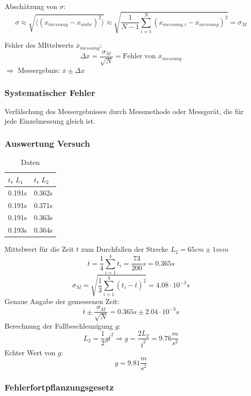 \documentclass[a4paper,10pt, fleqn]{article}
\begin{document}
Abschätzung von $\sigma$:
$$\sigma \approx \sqrt{\langle (x_{messung} - x_{wahr})^{2} \rangle} \approx \sqrt{\frac{1}{N-1}\sum_{i = 1}^{N}(x_{messung, i} - \overline{x}_{messung})^{2}} = \sigma_{M}$$

Fehler des MIttelwerts $\overline{x}_{messung}:$
$$\Delta x = \frac{\sigma_{M}}{\sqrt{N}} = \text{Fehler von } \overline{x}_{messung}$$
$\Rightarrow$ Messergebnis: $\overline{x} \pm \Delta x$

\subsubsection{Systematischer Fehler}
\label{sec:syst-fehl}

Verfälschung des Messergebnisses durch Messmethode oder Messgerät, die
für jede Einzelmessung gleich ist.

\subsubsection{Auswertung Versuch}
\label{sec:auswertung-versuch}

\begin{table}[h]
  \centering
  \begin{tabular}{l | l}
    $t$, $L_{1}$ & $t$, $L_{2}$ \\
    \hline
    0.191s & 0.362s \\
    0.191s & 0.371s \\
    0.191s & 0.363s \\
    0.193s & 0.364s \\
  \end{tabular}
  
  \caption{Daten}
\end{table}
Mittelwert für die Zeit $t$ zum Durchfallen der Strecke $L_{2} = 65cm \pm 1mm$
$$\overline{t} = \frac{1}{4}\sum_{i=1}^{4}t_{i} = \frac{73}{200}s = 0.365s$$
$$\sigma_{M} = \sqrt{\frac{1}{3}\sum_{i = 1}^{4}(t_{i} - \overline{t})^{2}} = 4.08 \cdot 10^{-3}s$$
Genaue Angabe der gemessenen Zeit:
$$\overline{t} \pm \frac{\sigma_{M}}{\sqrt{N}} = 0.365s \pm 2.04 \cdot 10^{-3}s$$
Berechnung der Fallbeschleunigung $g$:
$$L_{2} = \frac{1}{2}g\overline{t}^{2}\Rightarrow g = \frac{2L_{2}}{\overline{t}^{2}} = 9.76 \frac{m}{s^{2}}$$
Echter Wert von $g$:
$$g = 9.81 \frac{m}{s^{2}}$$

\subsubsection{Fehlerfortpflanzungsgesetz}
\label{sec:fehl}
\end{document}
